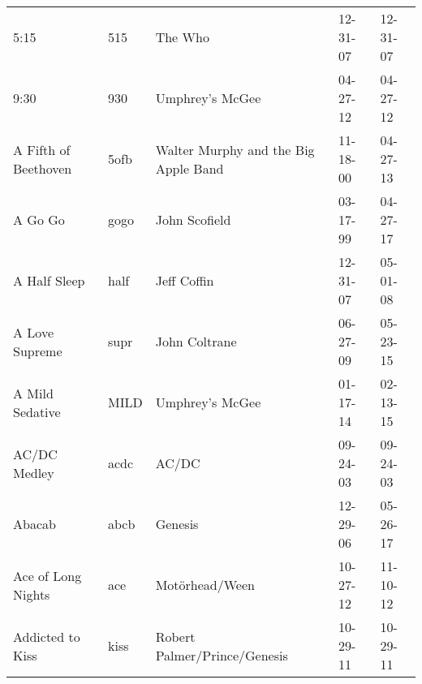 \begin{longtable}{p{}p{}p{}p{}p{}}
                                                                    5:15 &           515 &                                                  The Who &              12-31-07 &             12-31-07 \\
                                                                    9:30 &           930 &                                          Umphrey's McGee &              04-27-12 &             04-27-12 \\
                                                    A Fifth of Beethoven &          5ofb &                     Walter Murphy and the Big Apple Band &              11-18-00 &             04-27-13 \\
                                                                 A Go Go &          gogo &                                            John Scofield &              03-17-99 &             04-27-17 \\
                                                            A Half Sleep &          half &                                              Jeff Coffin &              12-31-07 &             05-01-08 \\
                                                          A Love Supreme &          supr &                                            John Coltrane &              06-27-09 &             05-23-15 \\
                                                         A Mild Sedative &          MILD &                                          Umphrey's McGee &              01-17-14 &             02-13-15 \\
                                                            AC/DC Medley &          acdc &                                                    AC/DC &              09-24-03 &             09-24-03 \\
                                                                  Abacab &          abcb &                                                  Genesis &              12-29-06 &             05-26-17 \\
                                                      Ace of Long Nights &           ace &                                           Motörhead/Ween &              10-27-12 &             11-10-12 \\
                                                        Addicted to Kiss &          kiss &                             Robert Palmer/Prince/Genesis &              10-29-11 &             10-29-11 \\

\end{longtable}
